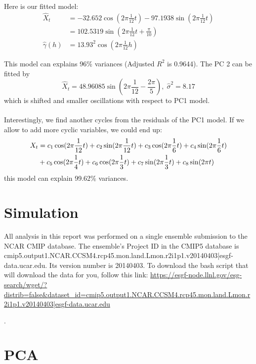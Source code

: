 \documentclass[11pt]{article}
\begin{document}
Here is our fitted model:
\begin{align}
\hat{X}_t & = -32.652 \cos(2\pi\frac{1}{12}t) -97.1938 \sin(2\pi\frac{1}{12}t) \\
&= 102.5319\sin(2\pi\frac{1}{12}t + \frac{\pi}{10})\\
\hat{\gamma}(h) &= 13.93^2\cos(2\pi\frac{1}{12}h) 
\end{align}

This model can explains 96\% variances (Adjusted $R^2$ is 0.9644). The PC 2 can be fitted by 
\begin{equation}
\hat{X}_t = 48.96085\sin(2\pi\frac{1}{12}-\frac{2\pi}{5} ),\; \hat{\sigma}^2 = 8.17
\end{equation}
which is shifted and smaller oscillations with respect to PC1 model. 

\paragraph{} Interestingly, we find another cycles from the residuals of the PC1 model.  If we allow to add more cyclic variables, we could end up:
\begin{align}
X_t &= c_1\cos(2\pi\frac{1}{12}t) + c_2\sin(2\pi\frac{1}{12}t) + c_3\cos(2\pi\frac{1}{6}t) + c_4\sin(2\pi\frac{1}{6}t) \notag\\
&+ c_5\cos(2\pi\frac{1}{4}t) + c_6\cos(2\pi\frac{1}{3}t) + c_7\sin(2\pi\frac{1}{3}t)  + c_8\sin(2\pi t)
\end{align}
this model can explain 99.62\% variances. 

\appendix
\section{Simulation}
All analysis in this report was performed on a single ensemble submission to the
NCAR CMIP database. The ensemble's Project ID in the CMIP5 database is
cmip5.output1.NCAR.CCSM4.rcp45.mon.land.Lmon.r2i1p1.v20140403|esgf-data.ucar.edu.
Its version number is 20140403. To download the bash script that will download
the data for you, follow this link:
\url{https://esgf-node.llnl.gov/esg-search/wget/?distrib=false&dataset_id=cmip5.output1.NCAR.CCSM4.rcp45.mon.land.Lmon.r2i1p1.v20140403|esgf-data.ucar.edu}

.

\section{PCA}
\end{document}
